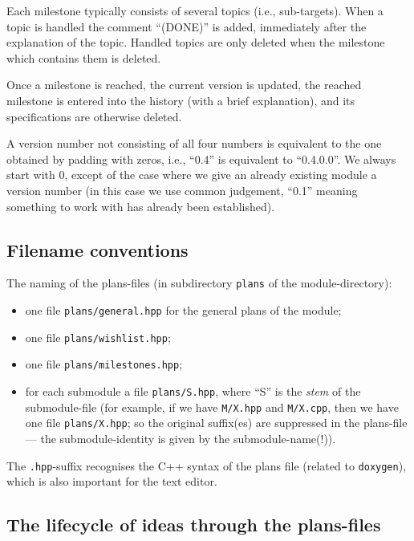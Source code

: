 \documentclass{book}
\newcommand{\filename}[1]{\texttt{#1}}
\newcommand{\name}[1]{\texttt{#1}}
\begin{document}
Each milestone typically consists of several topics (i.e., sub-targets). When a topic is handled the comment ``(DONE)'' is added, immediately after the explanation of the topic. Handled topics are only deleted when the milestone which contains them is deleted.

Once a milestone is reached, the current version is updated, the reached milestone is entered into the history (with a brief explanation), and its specifications are otherwise deleted.

A version number not consisting of all four numbers is equivalent to the one obtained by padding with zeros, i.e., ``0.4'' is equivalent to ``0.4.0.0''. We always start with 0, except of the case where we give an already existing module a version number (in this case we use common judgement, ``0.1'' meaning something to work with has already been established).




\subsection{Filename conventions}
\label{sec:DoxygenPlans}

The naming of the plans-files (in subdirectory \texttt{plans} of the module-directory):
\begin{itemize}
\item one file \filename{plans/general.hpp} for the general plans of the module;
\item one file \filename{plans/wishlist.hpp};
\item one file \filename{plans/milestones.hpp};
\item for each submodule a file \filename{plans/S.hpp}, where ``S'' is the \emph{stem} of the submodule-file (for example, if we have \filename{M/X.hpp} and \filename{M/X.cpp}, then we have one file \filename{plans/X.hpp}; so the original suffix(es) are suppressed in the plans-file --- the submodule-identity is given by the submodule-name(!)).
\end{itemize}
The \filename{.hpp}-suffix recognises the C++ syntax of the plans file (related to \name{doxygen}), which is also important for the text editor.



\subsection{The lifecycle of ideas through the plans-files}
\label{sec:DoxygenPlansflow}
\end{document}

